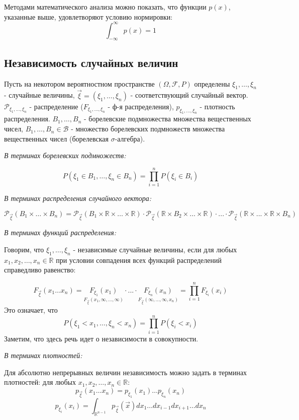 Методами математического анализа можно показать, что функции $p(x)$, указанные выше, удовлетворяют условию
нормировки:
\[ \int_{-\infty}^{\infty} p(x) = 1 \]

\subsection{Независимость случайных величин}

\begin{definition}
	Пусть на некотором вероятностном пространстве $(\Omega, \mathcal{F}, P)$ определены $\xi_1, \dots, \xi_n$ - случайные величины, $\vec{\xi} = (\xi_1, \dots, \xi_n)$ - соответствующий случайный вектор. $\mathcal{P}_{\xi_1, \dots, \xi_n}$ - распределение ($F_{\xi_1, \dots, \xi_n}$ - ф-я распределения), $p_{\xi_1, \dots, \xi_n}$ - плотность распределения. $B_1, \dots, B_n$ - борелевские подмножества множества вещественных чисел, $B_1, \dots, B_n \in \mathcal{B}$ - множество борелевских подмножеств множества вещественных чисел (борелевская $\sigma$-алгебра).
	
	\textit{В терминах борелевских подмножеств:}
	
	\[ P(\xi_1 \in B_1, \dots, \xi_n \in B_n) = \prod_{i=1}^{n} P(\xi_i \in B_i) \]
	
	\textit{В терминах распределения случайного вектора:}
	
	\[ \mathcal{P}_{\vec{\xi}} (B_1 \times \dots \times B_n) = \mathcal{P}_{\vec{\xi}} (B_1 \times \mathbb{R} \times \dots \times \mathbb{R}) \cdot \mathcal{P}_{\vec{\xi}} (\mathbb{R} \times B_2 \times \dots \times \mathbb{R}) \cdot ... \cdot \mathcal{P}_{\vec{\xi}} (\mathbb{R} \times ... \times \mathbb{R} \times B_n) \]
	
	\textit{В терминах функций распределения:}
	
	Говорим, что $\xi_1, \dots, \xi_n$ - независимые случайные величины, если для любых $x_1, x_2, \dots, x_n \in \mathbb{R}$ при условии совпадения всех функций распределений справедливо равенство:
	
	\[ F_{\vec{\xi}} (x_1 \dots x_n) = \underset{F_{\vec{\xi}}(x_1, \infty, \dots, \infty)}{F_{\xi_1}(x_1)} \cdot ... \cdot \underset{F_{\vec{\xi}}(\infty, \dots, \infty, x_n)}{F_{\xi_n}(x_n)} = \prod_{i=1}^{n} F_{\xi_i} (x_i) \]
	Это означает, что
	\[ P(\xi_1 < x_1, \dots, \xi_n < x_n) = \prod_{i=1}^{n} P(\xi_i < x_i) \]
	Заметим, что здесь речь идет о независимости в совокупности.
	
	\textit{В терминах плотностей:}
	
	Для абсолютно непрерывных величин независимость можно задать в терминах плотностей: для любых $x_1, x_2, \dots, x_n \in \mathbb{R}$:
	\[ p_{\vec{\xi}} (x_1 \dots x_n) = p_{\xi_1} (x_1) \dots p_{\xi_n} (x_n) \]
	\[ p_{\xi_i} (x_i) = \int_{\mathbb{R}^{n-1}} p_{\vec{\xi}} (\vec{x}) dx_1 \dots dx_{i-1} dx_{i+1} \dots dx_n \]
\end{definition}


